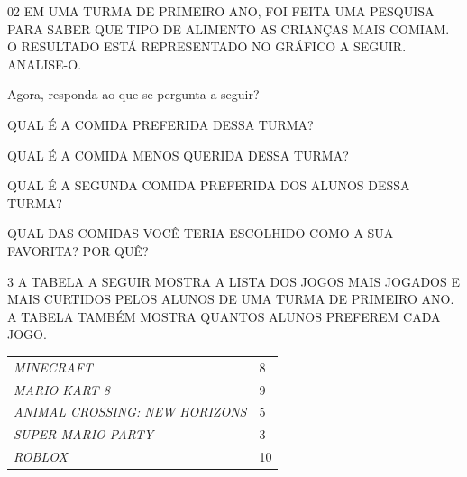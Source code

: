 \pagebreak
\num{02} EM UMA TURMA DE PRIMEIRO ANO, FOI FEITA UMA PESQUISA PARA SABER QUE TIPO DE ALIMENTO AS
CRIANÇAS MAIS COMIAM. O RESULTADO ESTÁ REPRESENTADO NO GRÁFICO A SEGUIR. ANALISE-O.


Agora, responda ao que se pergunta a seguir?

\begin{escolha}
\item QUAL É A COMIDA PREFERIDA DESSA TURMA?


\item QUAL É A COMIDA MENOS QUERIDA DESSA TURMA?


\item QUAL É A SEGUNDA COMIDA PREFERIDA DOS ALUNOS DESSA TURMA?


\item QUAL DAS COMIDAS VOCÊ TERIA ESCOLHIDO COMO A SUA FAVORITA? POR QUÊ?

\end{escolha}

\num{3} A TABELA A SEGUIR MOSTRA A LISTA DOS JOGOS MAIS JOGADOS E MAIS CURTIDOS PELOS
ALUNOS DE UMA TURMA DE PRIMEIRO ANO. A TABELA TAMBÉM MOSTRA QUANTOS ALUNOS PREFEREM CADA
JOGO.

\begin{longtable}[]{@{}ll@{}}
\toprule
\emph{MINECRAFT} & 8\tabularnewline
\emph{MARIO KART 8} & 9\tabularnewline
\emph{ANIMAL CROSSING: NEW HORIZONS} & 5\tabularnewline
\emph{SUPER MARIO PARTY} & 3\tabularnewline
\emph{ROBLOX} & 10\tabularnewline
\bottomrule
\end{longtable}

